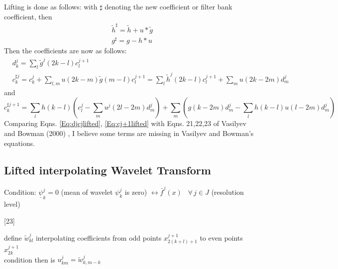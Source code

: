\documentclass[twoside]{amsart}
\theoremstyle{plain}
\theoremstyle{definition}
\theoremstyle{remark}
\numberwithin{equation}{section}
\begin{document}
Lifting is done as follows: with $\sharp$ denoting the new coefficient or filter bank coefficient, then
\begin{equation}\label{Eq:djcjlifted}
\boxed{
\begin{aligned}
  & \widetilde{h}^{\sharp} = \widetilde{h} + u * \widetilde{g} \\ 
  & g^{\sharp} = g- h* u
\end{aligned}
}\end{equation}
Then the coefficients are now as follows:
\begin{equation}\label{Eq:cj+1lifted}
\boxed{ \begin{aligned}
  & d^j_k = \sum_l \widetilde{g}^j(2k-l) c_l^{j+1} \\ 
  & c^{\sharp j}_k = c^j_k + \sum_{l,m} u(2k-m)\widetilde{g}(m-l) c_l^{j+1} = \sum_l \widetilde{h}^j(2k-l) c_l^{j+1} + \sum_m u(2k-2m)d^j_m
\end{aligned} }
\end{equation}
and
\begin{equation}
\boxed{ c^{\sharp j+1}_k = \sum_l h(k-l) (c_l^j - \sum_m u^j(2l-2m)d_m^j) + \sum_m (g(k-2m)d_m^j - \sum_l h(k-l)u(l-2m)d_m^j ) }
\end{equation}
Comparing Eqns. \ref{Eq:djcjlifted}, \ref{Eq:cj+1lifted} with Eqns. 21,22,23 of Vasilyev and Bowman (2000) \cite{OVasilyevCBowman2000}, I believe some terms are missing in Vasilyev and Bowman's equations.  


\subsection{Lifted interpolating Wavelet Transform}

Condition: $\underline{\psi}^j_k=0$ (mean of wavelet $\psi^j_k$ is zero) $\leftrightarrow \bar{f}^j(x)$ \, $\forall \, j \in J$ (resolution level)  

[23]

define $\widetilde{w}^j_{kl}$ interpolating coefficients from odd points $x^{j+1}_{2(k+l) +1}$ to even points $x^{j+1}_{2k}$ \\
condition then is $u^j_{km} = \widetilde{w}^j_{k,m-k}$
\end{document}
